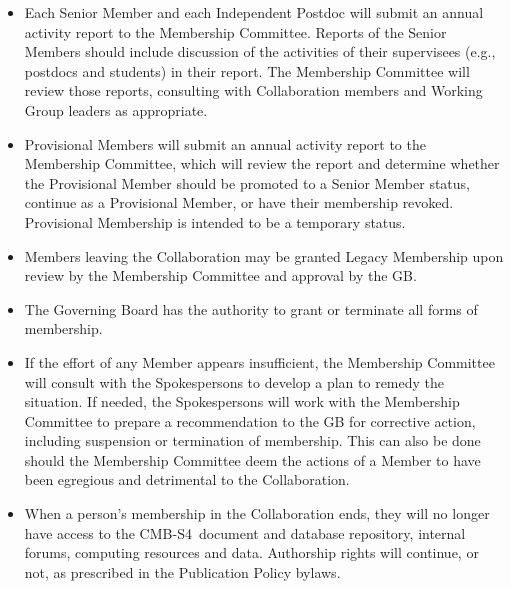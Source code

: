 \documentclass[12pt]{article}
\newcommand\collabname{CMB-S4}
\begin{document}
\begin{itemize} 

\item %
Each Senior Member and each Independent Postdoc will submit an annual activity report to the Membership Committee. Reports of the Senior Members should include discussion of the activities of their supervisees (e.g., postdocs and students) in their report. The Membership Committee will review those reports, consulting with Collaboration members and Working Group leaders as appropriate.
  
\item Provisional Members will submit an annual activity report to the Membership Committee, which will review the report and determine whether the Provisional Member should be promoted to a Senior Member status, continue as a Provisional Member, or have their membership revoked.  Provisional Membership is intended to be a temporary status.

\item Members leaving the Collaboration may be granted Legacy Membership upon review by the Membership Committee and approval by the GB.


\item The Governing Board has the authority to grant or terminate all forms of membership.


\item If the effort of any Member appears insufficient, the Membership Committee will consult with the Spokespersons to develop a plan to remedy the situation.  If needed, the Spokespersons will work with the Membership Committee to prepare a recommendation to the GB for corrective action, including suspension or termination of membership.   This can also be done should the Membership Committee deem the actions of a Member to have been egregious and detrimental to the Collaboration.


\item When a person's membership in the Collaboration ends, they will no longer have access to the \collabname\ document and database repository, internal forums, computing resources and data.  Authorship rights will continue, or not, as prescribed in the Publication Policy bylaws.


\end{itemize}
\end{document}
